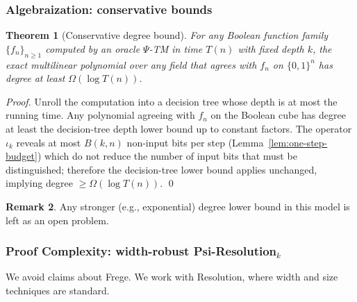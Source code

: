 \documentclass[11pt]{article}
\newtheorem{theorem}{Theorem}[section]
\theoremstyle{definition}
\newtheorem{remark}[theorem]{Remark}
\newcommand{\PSi}{\Psi}
\newcommand{\bits}{\{0,1\}}
\begin{document}
\subsubsection{Algebraization: conservative bounds}
\label{sec:algebraization}

\begin{theorem}[Conservative degree bound]
For any Boolean function family $\{f_n\}_{n\ge1}$ computed by an oracle $\PSi$-TM in time $T(n)$ with fixed depth $k$, the exact multilinear polynomial over any field that agrees with $f_n$ on $\bits^n$ has degree at least $\Omega(\log T(n))$.
\end{theorem}
\begin{proof}
Unroll the computation into a decision tree whose depth is at most the running time. Any polynomial agreeing with $f_n$ on the Boolean cube has degree at least the decision-tree depth lower bound up to constant factors. The operator $\iota_k$ reveals at most $B(k,n)$ non-input bits per step (Lemma~\ref{lem:one-step-budget}) which do not reduce the number of input bits that must be distinguished; therefore the decision-tree lower bound applies unchanged, implying degree $\ge \Omega(\log T(n))$. \qed
\end{proof}

\begin{remark}
Any stronger (e.g., exponential) degree lower bound in this model is left as an open problem.
\end{remark}

\subsubsection{Proof Complexity: width-robust Psi-Resolution$_k$}
\label{sec:proof-complexity}

We avoid claims about Frege. We work with Resolution, where width and size techniques are standard.
\end{document}
